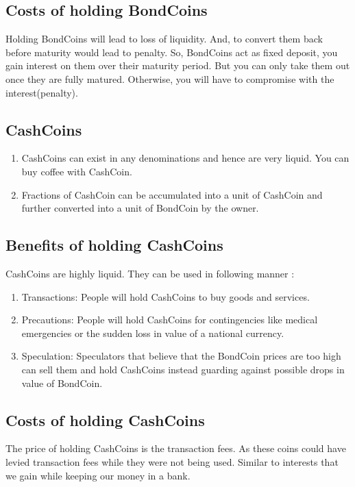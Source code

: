 \subsection{Costs of holding BondCoins}

Holding BondCoins will lead to loss of liquidity. And, to convert them back before maturity would lead to penalty. So, BondCoins act as fixed deposit, you gain interest on them over their maturity period. But you can only take them out once they are fully matured. Otherwise, you will have to compromise with the interest(penalty).

\subsection{CashCoins}

\begin{enumerate}
    \item CashCoins can exist in any denominations and hence are very liquid. You can buy coffee with CashCoin.
    \item Fractions of CashCoin can be accumulated into a unit of CashCoin and further converted into a unit of BondCoin by the owner.
\end{enumerate}

\subsection{Benefits of holding CashCoins}

CashCoins are highly liquid. They can be used in following manner :

\begin{enumerate}
    \item Transactions: People will hold CashCoins to buy goods and services.
    \item Precautions: People will hold CashCoins for contingencies like medical emergencies or the sudden loss in value of a national currency.
    \item Speculation: Speculators that believe that the BondCoin prices are too high can sell them and hold CashCoins instead guarding against possible drops in value of BondCoin.
\end{enumerate}

\subsection{Costs of holding CashCoins}

The price of holding CashCoins is the transaction fees. As these coins could have levied transaction fees while they were not being used. Similar to interests that we gain while keeping our money in a bank.

